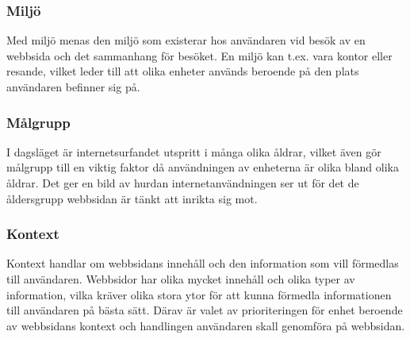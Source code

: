 \documentclass[11pt]{article}
\begin{document}
\subsubsection{Miljö}
Med miljö menas den miljö som existerar hos användaren vid besök av en webbsida och det sammanhang för besöket. En miljö kan t.ex. vara kontor eller resande, vilket leder till att olika enheter används beroende på den plats användaren befinner sig på.

\subsubsection{Målgrupp}
I dagsläget är internetsurfandet utspritt i många olika åldrar, vilket även gör målgrupp till en viktig faktor då användningen av enheterna är olika bland olika åldrar. Det ger en bild av hurdan internetanvändningen ser ut för det de åldersgrupp webbsidan är tänkt att inrikta sig mot.

\subsubsection{Kontext}
Kontext handlar om webbsidans innehåll och den information som vill förmedlas till användaren. Webbsidor har olika mycket innehåll och olika typer av information, vilka kräver olika stora ytor för att kunna förmedla informationen till användaren på bästa sätt.  Därav är valet av prioriteringen för enhet beroende av webbsidans kontext och handlingen användaren skall genomföra på webbsidan.
\end{document}
